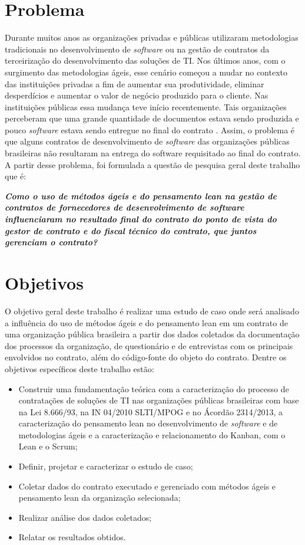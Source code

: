 \section[Problema]{Problema}

Durante muitos anos as organizações privadas e públicas utilizaram metodologias tradicionais no desenvolvimento de \textit{software} ou na gestão de contratos da terceirização do desenvolvimento das soluções de TI. Nos últimos anos, com o surgimento das metodologias ágeis, esse cenário começou a mudar no contexto das instituições privadas a fim de aumentar sua produtividade, eliminar desperdícios e aumentar o valor de negócio produzido para o cliente. Nas instituições públicas essa mudança teve início recentemente. Tais organizações perceberam que uma grande quantidade de documentos estava sendo produzida e pouco \textit{software} estava sendo entregue no final do contrato \cite{TCU:2013}. Assim, o problema é que alguns contratos de desenvolvimento de \textit{software} das organizações públicas brasileiras não resultaram na entrega do software requisitado ao final do contrato. A partir desse problema, foi formulada a questão de pesquisa geral deste trabalho que é:

\textit{\textbf {Como o uso de métodos ágeis e do pensamento lean na gestão de contratos de fornecedores de desenvolvimento de software influenciaram no resultado final do contrato do ponto de vista do gestor de contrato e do fiscal técnico do contrato, que juntos gerenciam o contrato?
}}

\section[Objetivos]{Objetivos}

O objetivo geral deste trabalho é realizar uma estudo de caso onde será analisado a influência do uso de métodos ágeis e do pensamento lean em um contrato de uma organização pública brasileira a partir dos dados coletados da documentação dos processos da organização, de questionário e de entrevistas com os principais envolvidos no contrato, além do código-fonte do objeto do contrato. Dentre os objetivos específicos deste trabalho estão:

\begin{itemize}
\item Construir uma fundamentação teórica com a caracterização do processo de contratações de soluções de TI nas organizações públicas brasileiras com base na Lei 8.666/93, na IN 04/2010 SLTI/MPOG e no Ácordão 2314/2013, a caracterização do pensamento lean no desenvolvimento de \textit{software} e de metodologias ágeis e a caracterização e relacionamento do Kanban, com o Lean e o Scrum;
\item Definir, projetar e caracterizar o estudo de caso;
\item Coletar dados do contrato executado e gerenciado com métodos ágeis e pensamento lean da organização selecionada;
\item Realizar análise dos dados coletados;
\item Relatar os resultados obtidos.
\end{itemize}


